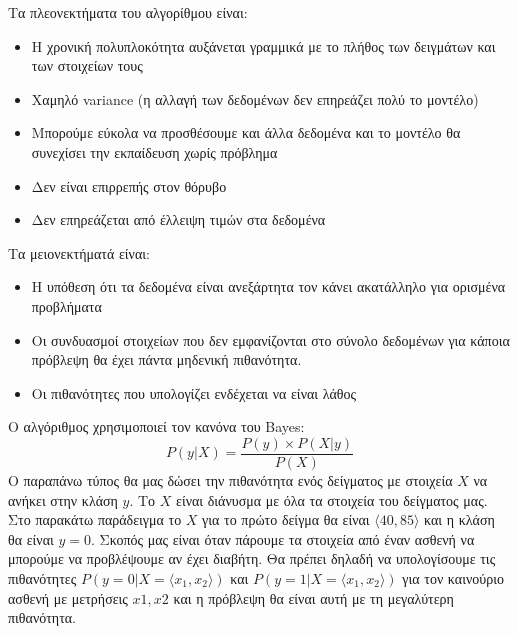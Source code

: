 Τα πλεονεκτήματα του αλγορίθμου είναι\cite{naive2023}:
\begin{itemize}
    \item Η χρονική πολυπλοκότητα αυξάνεται γραμμικά με το πλήθος των δειγμάτων και των
    στοιχείων τους
    \item Χαμηλό \textlatin{variance} (η αλλαγή των δεδομένων δεν επηρεάζει πολύ το μοντέλο)
    \item Μπορούμε εύκολα να προσθέσουμε και άλλα δεδομένα και το μοντέλο θα συνεχίσει την
    εκπαίδευση χωρίς πρόβλημα
    \item Δεν είναι επιρρεπής στον θόρυβο
    \item Δεν επηρεάζεται από έλλειψη τιμών στα δεδομένα
\end{itemize}

Τα μειονεκτήματά είναι:
\begin{itemize}
    \item Η υπόθεση ότι τα δεδομένα είναι ανεξάρτητα τον κάνει ακατάλληλο για ορισμένα
    προβλήματα
    \item Οι συνδυασμοί στοιχείων που δεν εμφανίζονται στο σύνολο δεδομένων για κάποια
    πρόβλεψη θα έχει πάντα μηδενική πιθανότητα.
    \item Οι πιθανότητες που υπολογίζει ενδέχεται να είναι λάθος
\end{itemize}

Ο αλγόριθμος χρησιμοποιεί τον κανόνα του \textlatin{Bayes}:
$$P(y|X)=\frac{P(y)\times{P(X|y)}}{P(X)}$$
Ο παραπάνω τύπος θα μας δώσει την πιθανότητα ενός δείγματος με στοιχεία $X$ να ανήκει στην
κλάση $y$. Το $X$ είναι διάνυσμα με όλα τα στοιχεία του δείγματος μας. Στο παρακάτω
παράδειγμα το $X$ για το πρώτο δείγμα θα είναι $\langle40,85\rangle$ και η κλάση θα είναι
$y=0$. Σκοπός μας είναι όταν πάρουμε τα στοιχεία από έναν ασθενή να μπορούμε να προβλέψουμε
αν έχει διαβήτη. Θα πρέπει δηλαδή να υπολογίσουμε τις πιθανότητες
$P\left(y=0|X=\langle x_1,x_2\rangle\right)$ και $P\left(y=1|X=\langle x_1,x_2\rangle\right)$
για τον καινούριο ασθενή με μετρήσεις $x1,x2$ και η πρόβλεψη θα είναι αυτή με τη μεγαλύτερη
πιθανότητα.

